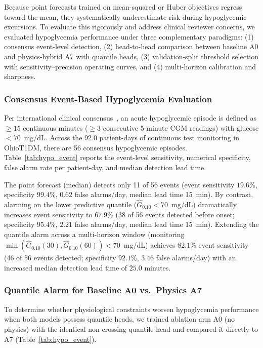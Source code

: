 \documentclass[journal]{IEEEtran}
\begin{document}
Because point forecasts trained on mean-squared or Huber objectives regress toward the mean, they systematically underestimate risk during hypoglycemic excursions. To evaluate this rigorously and address clinical reviewer concerns, we evaluated hypoglycemia performance under three complementary paradigms: (1) consensus event-level detection, (2) head-to-head comparison between baseline A0 and physics-hybrid A7 with quantile heads, (3) validation-split threshold selection with sensitivity--precision operating curves, and (4) multi-horizon calibration and sharpness.

\subsubsection{Consensus Event-Based Hypoglycemia Evaluation}
Per international clinical consensus~\cite{ref52}, an acute hypoglycemic episode is defined as $\ge 15$ continuous minutes ($\ge 3$ consecutive 5-minute CGM readings) with glucose $< 70$~mg/dL. Across the 92.0 patient-days of continuous test monitoring in OhioT1DM, there are 56 consensus hypoglycemic episodes. Table~\ref{tab:hypo_event} reports the event-level sensitivity, numerical specificity, false alarm rate per patient-day, and median detection lead time.

The point forecast (median) detects only 11 of 56 events (event sensitivity $19.6\%$, specificity $99.4\%$, $0.62$ false alarms/day, median lead time 15~min). By contrast, alarming on the lower predictive quantile ($\hat{G}_{0.10} < 70$~mg/dL) dramatically increases event sensitivity to $67.9\%$ (38 of 56 events detected before onset; specificity $95.4\%$, $2.21$ false alarms/day, median lead time 15~min). Extending the quantile alarm across a multi-horizon window (monitoring $\min(\hat{G}_{0.10}(30), \hat{G}_{0.10}(60)) < 70$~mg/dL) achieves $82.1\%$ event sensitivity (46 of 56 events detected; specificity $92.1\%$, $3.46$ false alarms/day) with an increased median detection lead time of $25.0$ minutes.

\subsubsection{Quantile Alarm for Baseline A0 vs.\ Physics A7}
To determine whether physiological constraints worsen hypoglycemia performance when both models possess quantile heads, we trained ablation arm A0 (no physics) with the identical non-crossing quantile head and compared it directly to A7 (Table~\ref{tab:hypo_event}).
\end{document}
